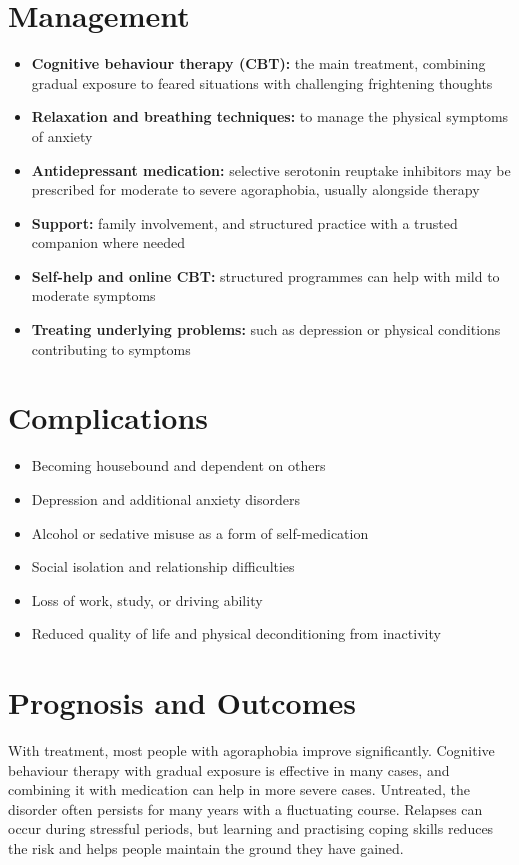 \section*{Management}
\begin{itemize}
    \item \textbf{Cognitive behaviour therapy (CBT):} the main treatment, combining gradual exposure to feared situations with challenging frightening thoughts
    \item \textbf{Relaxation and breathing techniques:} to manage the physical symptoms of anxiety
    \item \textbf{Antidepressant medication:} selective serotonin reuptake inhibitors may be prescribed for moderate to severe agoraphobia, usually alongside therapy
    \item \textbf{Support:} family involvement, and structured practice with a trusted companion where needed
    \item \textbf{Self-help and online CBT:} structured programmes can help with mild to moderate symptoms
    \item \textbf{Treating underlying problems:} such as depression or physical conditions contributing to symptoms
\end{itemize}

\section*{Complications}
\begin{itemize}
    \item Becoming housebound and dependent on others
    \item Depression and additional anxiety disorders
    \item Alcohol or sedative misuse as a form of self-medication
    \item Social isolation and relationship difficulties
    \item Loss of work, study, or driving ability
    \item Reduced quality of life and physical deconditioning from inactivity
\end{itemize}

\section*{Prognosis and Outcomes}
With treatment, most people with agoraphobia improve significantly. Cognitive behaviour therapy with gradual exposure is effective in many cases, and combining it with medication can help in more severe cases. Untreated, the disorder often persists for many years with a fluctuating course. Relapses can occur during stressful periods, but learning and practising coping skills reduces the risk and helps people maintain the ground they have gained.

